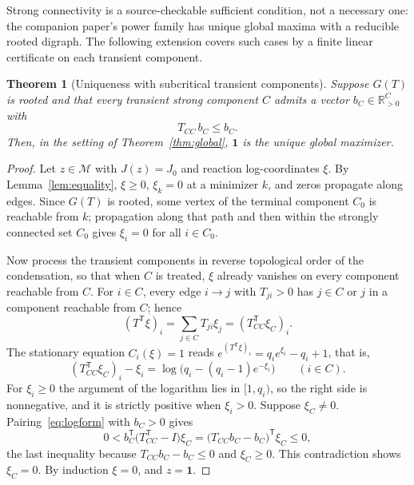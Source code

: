 \documentclass[11pt,a4paper]{article}
\theoremstyle{plain}
\newtheorem{theorem}{Theorem}[section]
\theoremstyle{definition}
\theoremstyle{remark}
\numberwithin{equation}{section}
\newcommand{\R}{\mathbb{R}}
\newcommand{\T}{\mathsf{T}}
\newcommand{\one}{\mathbf{1}}
\newcommand{\fiber}{\mathcal{M}}
\begin{document}
Strong connectivity is a source-checkable sufficient condition, not a necessary one: the companion paper's power family has unique global maxima with a reducible rooted digraph. The following extension covers such cases by a finite linear certificate on each transient component.

\begin{theorem}[Uniqueness with subcritical transient components]\label{thm:subcritical}
Suppose $G(T)$ is rooted and that every transient strong component $C$ admits a vector $b_C\in\R^C_{>0}$ with
\begin{equation}\label{eq:subcritical}
 T_{CC}\,b_C\le b_C .
\end{equation}
Then, in the setting of Theorem~\ref{thm:global}, $\one$ is the unique global maximizer.
\end{theorem}
\begin{proof}
Let $z\in\fiber$ with $J(z)=J_0$ and reaction log-coordinates $\xi$. By Lemma~\ref{lem:equality}, $\xi\ge0$, $\xi_k=0$ at a minimizer $k$, and zeros propagate along edges. Since $G(T)$ is rooted, some vertex of the terminal component $C_0$ is reachable from $k$; propagation along that path and then within the strongly connected set $C_0$ gives $\xi_i=0$ for all $i\in C_0$.

Now process the transient components in reverse topological order of the condensation, so that when $C$ is treated, $\xi$ already vanishes on every component reachable from $C$. For $i\in C$, every edge $i\to j$ with $T_{ji}>0$ has $j\in C$ or $j$ in a component reachable from $C$; hence
\[
 (T^{\T}\xi)_i=\sum_{j\in C}T_{ji}\xi_j=(T_{CC}^{\T}\xi_C)_i .
\]
The stationary equation $C_i(\xi)=1$ reads $e^{(T^{\T}\xi)_i}=q_ie^{\xi_i}-q_i+1$, that is,
\begin{equation}\label{eq:logform}
 (T_{CC}^{\T}\xi_C)_i-\xi_i=\log\big(q_i-(q_i-1)e^{-\xi_i}\big)\qquad(i\in C).
\end{equation}
For $\xi_i\ge0$ the argument of the logarithm lies in $[1,q_i)$, so the right side is nonnegative, and it is strictly positive when $\xi_i>0$. Suppose $\xi_C\ne0$. Pairing~\eqref{eq:logform} with $b_C>0$ gives
\[
 0<b_C^{\T}\big(T_{CC}^{\T}-I\big)\xi_C=\big(T_{CC}b_C-b_C\big)^{\T}\xi_C\le0,
\]
the last inequality because $T_{CC}b_C-b_C\le0$ and $\xi_C\ge0$. This contradiction shows $\xi_C=0$. By induction $\xi=0$, and $z=\one$.
\end{proof}
\end{document}
